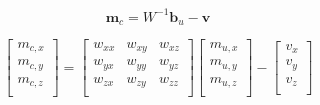 \begin{equation}
    \label{eq:magnetometer}
    \pmb{m}_c = W^{-1} \pmb{b}_u - \pmb{v}
\end{equation}

\begin{equation}
\label{eq:magnetometerExpanded}
    \begin{bmatrix}
        m_{c,x}\\
        m_{c,y}\\
        m_{c,z}\\
    \end{bmatrix}
    =
    \begin{bmatrix}
        w_{xx} & w_{xy} & w_{xz}\\
        w_{yx} & w_{yy} & w_{yz}\\
        w_{zx} & w_{zy} & w_{zz}\\
    \end{bmatrix}
    \begin{bmatrix}
        m_{u,x}\\
        m_{u,y}\\
        m_{u,z}\\
    \end{bmatrix}
    -
    \begin{bmatrix}
        v_{x}\\
        v_{y}\\
        v_{z}\\
    \end{bmatrix}
\end{equation}
